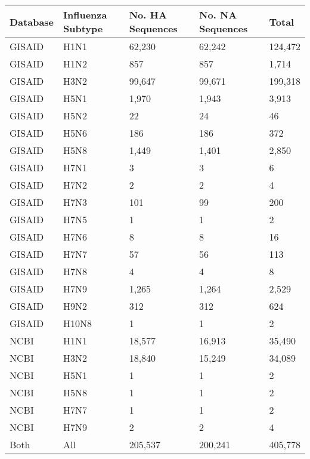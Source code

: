 \begin{tabular}{L{0.5in}|L{0.5in}|L{0.7in}|L{0.7in}|L{0.5in}}\hline
 Database & Influenza  Subtype & No.  HA  Sequences & No.  NA  Sequences & Total \\\hline
GISAID&H1N1&62,230&62,242&124,472\\\hline
GISAID&H1N2&857&857&1,714\\\hline
GISAID&H3N2&99,647&99,671&199,318\\\hline
GISAID&H5N1&1,970&1,943&3,913\\\hline
GISAID&H5N2&22&24&46\\\hline
GISAID&H5N6&186&186&372\\\hline
GISAID&H5N8&1,449&1,401&2,850\\\hline
GISAID&H7N1&3&3&6\\\hline
GISAID&H7N2&2&2&4\\\hline
GISAID&H7N3&101&99&200\\\hline
GISAID&H7N5&1&1&2\\\hline
GISAID&H7N6&8&8&16\\\hline
GISAID&H7N7&57&56&113\\\hline
GISAID&H7N8&4&4&8\\\hline
GISAID&H7N9&1,265&1,264&2,529\\\hline
GISAID&H9N2&312&312&624\\\hline
GISAID&H10N8&1&1&2\\\hline
NCBI&H1N1&18,577&16,913&35,490\\\hline
NCBI&H3N2&18,840&15,249&34,089\\\hline
NCBI&H5N1&1&1&2\\\hline
NCBI&H5N8&1&1&2\\\hline
NCBI&H7N7&1&1&2\\\hline
NCBI&H7N9&2&2&4\\\hline
Both&All&205,537&200,241&405,778\\\hline
\end{tabular}

